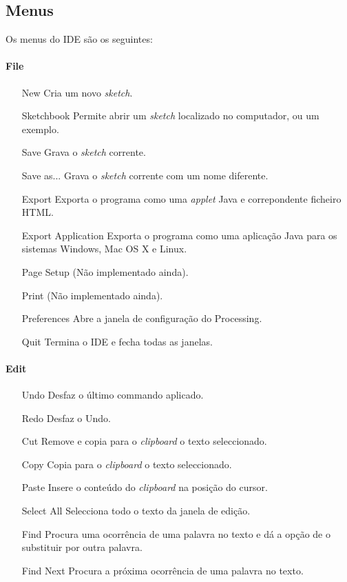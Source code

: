 \subsection{Menus}
Os menus do IDE são os seguintes:
\paragraph{File}
\begin{itemize} 
\item[New] Cria um novo \emph{sketch}.
\item[Sketchbook] Permite abrir um \emph{sketch} localizado no computador, ou um exemplo.
\item[Save] Grava o \emph{sketch} corrente.
\item[Save as...] Grava o \emph{sketch} corrente com um nome diferente.
\item[Export] Exporta o programa como uma \emph{applet} Java e correpondente ficheiro HTML.
\item[Export Application] Exporta o programa como uma aplicação Java para os sistemas Windows, Mac OS X e Linux. 
\item[Page Setup] (Não implementado ainda).
\item[Print] (Não implementado ainda).
\item[Preferences] Abre a janela de configuração do Processing.
\item[Quit] Termina o IDE e fecha todas as janelas.
\end{itemize}

\paragraph{Edit}
\begin{itemize}
\item[Undo] Desfaz o último commando aplicado.
\item[Redo] Desfaz o Undo.
\item[Cut] Remove e copia para o \emph{clipboard} o texto seleccionado.
\item[Copy] Copia para o \emph{clipboard} o texto seleccionado.
\item[Paste] Insere o conteúdo do \emph{clipboard} na posição do cursor.
\item[Select All] Selecciona todo o texto da janela de edição.
\item[Find] Procura uma ocorrência de uma palavra no texto e dá a opção de o substituir por outra palavra.
\item[Find Next] Procura a próxima ocorrência de uma palavra no texto.
\end{itemize}

